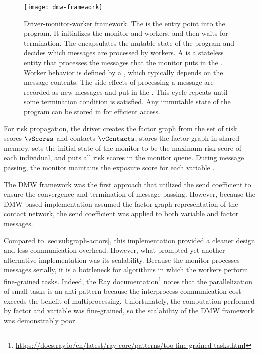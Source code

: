 \begin{figure}[htbp]
\centering
\texttt{[image: dmw-framework]}
\caption[Driver-monitor-worker framework]{Driver-monitor-worker framework. The  is the entry point into the program. It initializes the monitor and workers, and then waits for termination. The  encapsulates the mutable state of the program and decides which messages are processed by workers. A  is a stateless entity that processes the messages that the monitor puts in the . Worker behavior is defined by a , which typically depends on the message contents. The side effects of processing a message are recorded as new messages and put in the . This cycle repeats until some termination condition is satisfied. Any immutable state of the program can be stored in  for efficient access.}
\label{fig:dmw-framework}
\end{figure}

For risk propagation, the driver creates the factor graph from the set of risk scores $\vScores$ and contacts $\vContacts$, stores the factor graph in shared memory, sets the initial state of the monitor to be the maximum risk score of each individual, and puts all risk scores in the monitor queue. During message passing, the monitor maintains the exposure score for each variable \vertexName.

The DMW framework was the first approach that utilized the send coefficient to ensure the convergence and termination of message passing. However, because the DMW-based implementation assumed the factor graph representation of the contact network, the send coefficient was applied to both variable and factor messages.

Compared to \cref{sec:subgraph-actors}, this implementation provided a cleaner design and less communication overhead. However, what prompted yet another alternative implementation was its scalability. Because the monitor processes messages serially, it is a bottleneck for algorithms in which the workers perform fine-grained tasks. Indeed, the Ray documentation\footnote{\url{https://docs.ray.io/en/latest/ray-core/patterns/too-fine-grained-tasks.html}} notes that the parallelization of small tasks is an anti-pattern because the interprocess communication cost exceeds the benefit of multiprocessing. Unfortunately, the computation performed by factor \verticesName and variable \verticesName was fine-grained, so the scalability of the DMW framework was demonstrably poor.

